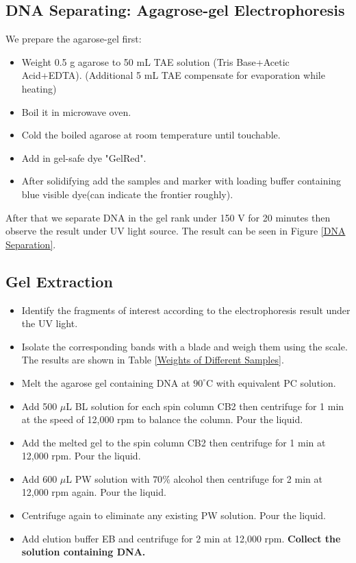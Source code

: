 \documentclass{article}
\begin{document}
\subsection{DNA Separating: Agagrose-gel Electrophoresis}
We prepare the agarose-gel first:
\begin{itemize}
    \item Weight 0.5 g agarose to 50 mL TAE solution (Tris Base+Acetic Acid+EDTA). (Additional 5 mL TAE compensate for evaporation while heating)
    \item Boil it in microwave oven.
    \item Cold the boiled agarose  at room temperature until touchable.
    \item Add in gel-safe dye "GelRed".
    \item After solidifying add the samples and marker with loading buffer containing blue visible dye(can indicate the frontier roughly).
\end{itemize}
After that we separate DNA in the gel rank under 150 V for 20 minutes then observe the result under UV light source. The result can be seen in Figure \ref{DNA Separation}.
\subsection{Gel Extraction}
\begin{itemize}
    \item Identify the fragments of interest according to the electrophoresis result under the UV light.
    \item Isolate the corresponding bands with a blade and weigh them using the scale. The results are shown in Table \ref{Weights of Different Samples}.

    \item Melt the agarose gel containing DNA at $90^\circ \mathrm{C}$ with equivalent PC solution.
    \item Add 500 $\mu$L BL solution for each spin column CB2 then centrifuge for 1 min at the speed of 12,000 rpm to balance the column. Pour the liquid.
    \item Add the melted gel to the spin column CB2 then centrifuge for 1 min at 12,000 rpm. Pour the liquid.
    \item Add 600 $\mu$L PW solution with $70\%$ alcohol then centrifuge for 2 min at 12,000 rpm again. Pour the liquid.
    \item Centrifuge again to eliminate any existing PW solution. Pour the liquid.
    \item Add elution buffer EB and centrifuge for 2 min at 12,000 rpm. \textbf{Collect the solution containing DNA.}
\end{itemize}
    
\end{document}
